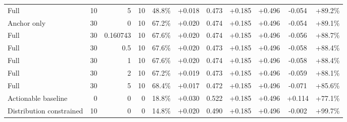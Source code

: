 \begin{table}[htbp]
\begin{tabular}{lrrrccccccc}
Full & 10 & 5 & 10 & 48.8\% & +0.018 & 0.473 & +0.185 & +0.496 & -0.054 & +89.2\% \\
Anchor only & 30 & 0 & 10 & 67.2\% & +0.020 & 0.474 & +0.185 & +0.496 & -0.054 & +89.1\% \\
Full & 30 & 0.160743 & 10 & 67.6\% & +0.020 & 0.474 & +0.185 & +0.496 & -0.056 & +88.7\% \\
Full & 30 & 0.5 & 10 & 67.6\% & +0.020 & 0.473 & +0.185 & +0.496 & -0.058 & +88.4\% \\
Full & 30 & 1 & 10 & 67.6\% & +0.020 & 0.474 & +0.185 & +0.496 & -0.058 & +88.4\% \\
Full & 30 & 2 & 10 & 67.2\% & +0.019 & 0.473 & +0.185 & +0.496 & -0.059 & +88.1\% \\
Full & 30 & 5 & 10 & 68.4\% & +0.017 & 0.472 & +0.185 & +0.496 & -0.071 & +85.6\% \\
Actionable baseline & 0 & 0 & 0 & 18.8\% & +0.030 & 0.522 & +0.185 & +0.496 & +0.114 & +77.1\% \\
Distribution constrained & 10 & 0 & 0 & 14.8\% & +0.020 & 0.490 & +0.185 & +0.496 & -0.002 & +99.7\% \\
\bottomrule
\end{tabular}
\end{table}